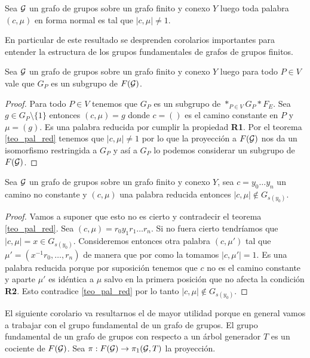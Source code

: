 \documentclass[tesis.tex]{subfiles}
\begin{document}
\begin{teo}\label{teo_pal_red}
	Sea ${\cal G}$ un grafo de grupos sobre un grafo finito y conexo $Y$ luego toda palabra $(c, \mu)$ en forma normal es tal que $|c,\mu| \neq 1$.
\end{teo}

En particular de este resultado se desprenden corolarios importantes para entender la estructura de los grupos fundamentales de grafos de grupos finitos.

\begin{coro}\label{coro_pal_red_1}
	Sea ${\cal G}$ un grafo de grupos sobre un grafo finito y conexo $Y$ luego para todo $P \in V$ vale que $G_P$ es un subgrupo de $F({\cal G})$.
\end{coro}
\begin{proof}
	Para todo $P \in V$ tenemos que $G_P$ es un subgrupo de $\ast_{P \in V} G_P \ast F_E$.
	Sea  $g \in G_{P} \setminus \{ 1 \}$ entonces $(c, \mu) = g$ donde $c = ()$ es el camino constante en $P$ y $\mu = (g)$.
	Es una palabra reducida por cumplir la propiedad \textbf{R1}.
	Por el teorema \ref{teo_pal_red} tenemos que $|c,\mu| \neq 1$ por lo que  la proyección a $F({\cal G})$ nos da un isomorfismo restringida a $G_P$ y así a $G_P$ lo podemos considerar un subgrupo de $F({\cal G})$.
\end{proof}

\begin{coro}\label{coro_pal_red_2}
	Sea ${\cal G}$ un grafo de grupos sobre un grafo finito y conexo $Y$, sea $c = y_0 \dots y_n$ un camino no constante y $(c, \mu)$ una palabra reducida entonces $|c, \mu| \notin G_{s(y_0)}$.
\end{coro}
\begin{proof}
	Vamos a suponer que esto no es cierto y contradecir el teorema \ref{teo_pal_red}.
	Sea $(c, \mu) = r_0y_1r_1\dots r_n$.
	Si no fuera cierto tendríamos que $|c,\mu| = x \in G_{s(y_0)}$. 
	Consideremos entonces otra palabra $(c,\mu')$ tal que $\mu' = (x^{-1}r_0, \dots, r_n)$ de manera que por como la tomamos $|c,\mu'| = 1$.
	Es una palabra reducida porque por suposición tenemos que $c$ no es el camino constante y aparte $\mu'$ es idéntica a $\mu$ salvo en la primera posición que no afecta la condición \textbf{R2}.
	Esto contradice \ref{teo_pal_red} por lo tanto $|c, \mu| \notin G_{s(y_0)}$.
\end{proof}

El siguiente corolario va resultarnos el de mayor utilidad porque en general vamos a trabajar con el grupo fundamental de un grafo de grupos.
El grupo fundamental de un grafo de grupos con respecto a un árbol generador $T$ es un cociente de $F({\cal G})$. 
Sea $\pi: F({\cal G}) \to \pi_1({\cal G},T)$ la proyección.
\end{document}

